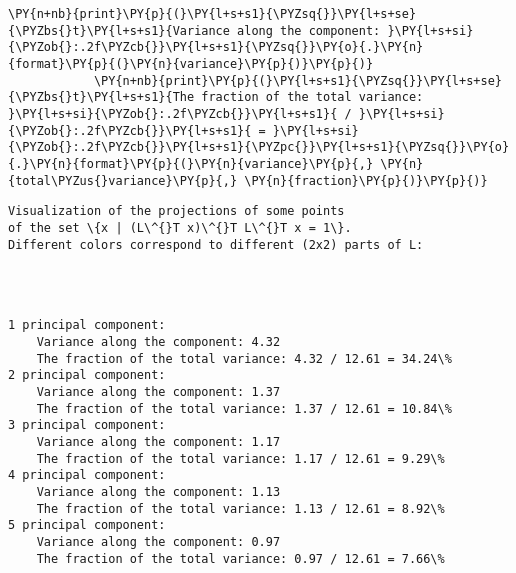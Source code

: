 \begin{Verbatim}[commandchars=\\\{\}]
            \PY{n+nb}{print}\PY{p}{(}\PY{l+s+s1}{\PYZsq{}}\PY{l+s+se}{\PYZbs{}t}\PY{l+s+s1}{Variance along the component: }\PY{l+s+si}{\PYZob{}:.2f\PYZcb{}}\PY{l+s+s1}{\PYZsq{}}\PY{o}{.}\PY{n}{format}\PY{p}{(}\PY{n}{variance}\PY{p}{)}\PY{p}{)}
            \PY{n+nb}{print}\PY{p}{(}\PY{l+s+s1}{\PYZsq{}}\PY{l+s+se}{\PYZbs{}t}\PY{l+s+s1}{The fraction of the total variance: }\PY{l+s+si}{\PYZob{}:.2f\PYZcb{}}\PY{l+s+s1}{ / }\PY{l+s+si}{\PYZob{}:.2f\PYZcb{}}\PY{l+s+s1}{ = }\PY{l+s+si}{\PYZob{}:.2f\PYZcb{}}\PY{l+s+s1}{\PYZpc{}}\PY{l+s+s1}{\PYZsq{}}\PY{o}{.}\PY{n}{format}\PY{p}{(}\PY{n}{variance}\PY{p}{,} \PY{n}{total\PYZus{}variance}\PY{p}{,} \PY{n}{fraction}\PY{p}{)}\PY{p}{)}
\end{Verbatim}

    \begin{Verbatim}[commandchars=\\\{\}]
Visualization of the projections of some points 
of the set \{x | (L\^{}T x)\^{}T L\^{}T x = 1\}.
Different colors correspond to different (2x2) parts of L:

    \end{Verbatim}

    \begin{center}
    \end{center}
    { \hspace*{\fill} \\}
    
    \begin{Verbatim}[commandchars=\\\{\}]

1 principal component:
	Variance along the component: 4.32
	The fraction of the total variance: 4.32 / 12.61 = 34.24\%
2 principal component:
	Variance along the component: 1.37
	The fraction of the total variance: 1.37 / 12.61 = 10.84\%
3 principal component:
	Variance along the component: 1.17
	The fraction of the total variance: 1.17 / 12.61 = 9.29\%
4 principal component:
	Variance along the component: 1.13
	The fraction of the total variance: 1.13 / 12.61 = 8.92\%
5 principal component:
	Variance along the component: 0.97
	The fraction of the total variance: 0.97 / 12.61 = 7.66\%

    \end{Verbatim}


